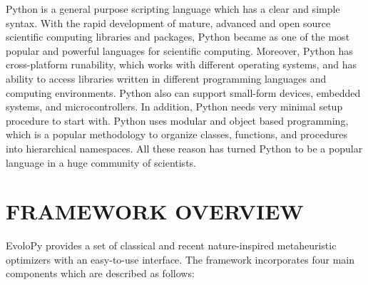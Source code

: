 \documentclass[a4paper,twoside]{article}
\begin{document}
Python is a general purpose scripting language which has a clear and simple syntax. With the rapid development of mature, advanced  and open source scientific computing libraries and packages, Python became as one of the most popular and powerful languages for scientific computing.
Moreover, Python has cross-platform runability, which works with different operating systems, and has ability to access libraries written in different programming languages and computing environments. Python also can support small-form devices, embedded systems, and microcontrollers. In addition, Python needs very minimal setup procedure to start with. Python uses modular and object based programming, which is a popular methodology to organize classes, functions, and procedures into hierarchical namespaces. All these reason has turned Python to be a popular language in a huge community of scientists. 

\section{\uppercase{Framework Overview}}

EvoloPy provides a set of classical and recent nature-inspired metaheuristic optimizers with an easy-to-use interface. The framework incorporates four main components which are described as follows: 
\end{document}
